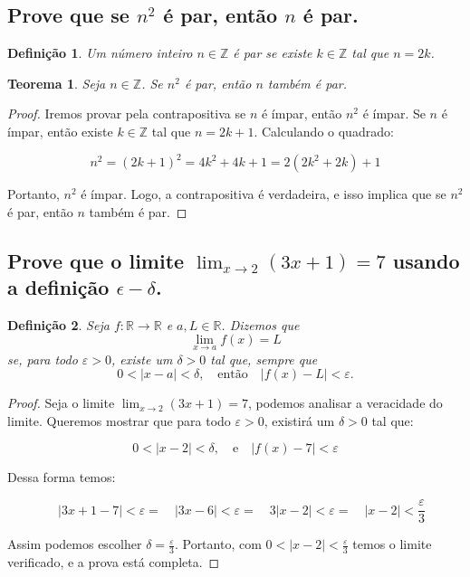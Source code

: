 \documentclass{article}
\newtheorem{definition}{Definição}
\newtheorem{theorem}{Teorema}[section]
\begin{document}
\subsection{Prove que se $n^2$ é par, então $n$ é par.}

\begin{definition}
    Um número inteiro $n \in \mathbb{Z}$ é par se existe $k \in \mathbb{Z}$ tal que $n = 2k$.
\end{definition}

\begin{theorem}
    Seja $n \in \mathbb{Z}$. Se $n^2$ é par, então $n$ também é par.
\end{theorem}

\begin{proof}
    Iremos provar pela contrapositiva se $n$ é ímpar, então $n^2$ é ímpar. Se $n$ é ímpar, então existe $k \in \mathbb{Z}$ tal que $n = 2k + 1$. Calculando o quadrado:

    $$
    n^2 = (2k + 1)^2 = 4k^2 + 4k + 1 = 2(2k^2 + 2k) + 1
    $$

    Portanto, $n^2$ é ímpar. Logo, a contrapositiva é verdadeira, e isso implica que se $n^2$ é par, então $n$ também é par.
\end{proof}

\subsection{Prove que o limite $\lim_{x \to 2} (3x + 1) = 7$ usando a definição $\epsilon-\delta$.}

\begin{definition}
    Seja $f: \mathbb{R} \to \mathbb{R}$ e $a, L \in \mathbb{R}$. Dizemos que
\[
\lim_{x \to a} f(x) = L
\]
se, para todo $\varepsilon > 0$, existe um $\delta > 0$ tal que, sempre que
\[
0 < |x - a| < \delta, \quad \text{então} \quad |f(x) - L| < \varepsilon.
\]
\end{definition}

\begin{proof}
    Seja o limite $\lim_{x \to 2} (3x + 1) = 7$, podemos analisar a veracidade do limite. Queremos mostrar que para todo $\varepsilon > 0$, existirá um $\delta > 0$ tal que:

    $$0 < |x - 2| < \delta, \quad \text{e} \quad |f(x) - 7| < \varepsilon$$

    Dessa forma temos:

    $$\quad |3x+1 - 7| < \varepsilon = \quad |3x - 6| < \varepsilon = \quad 3|x - 2| < \varepsilon = \quad |x - 2| < \frac{\varepsilon}{3}$$

    Assim podemos escolher $\delta = \frac{\varepsilon}{3}$. Portanto, com $0 < |x - 2| < \frac{\varepsilon}{3}$ temos o limite verificado, e a prova está completa.

    

    
\end{proof}
\end{document}
